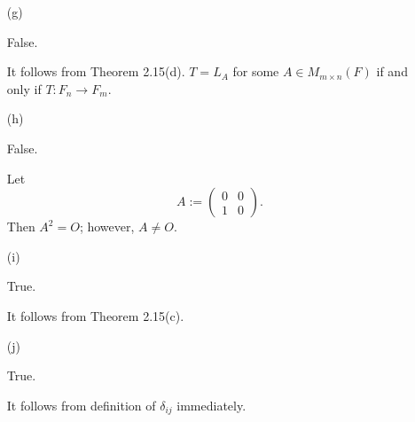 \begin{Exercise}
\begin{enumerate}[(a)]
		\item[(g)]
		\begin{answer}
			False.
		\end{answer}
		\begin{solution}
			It follows from Theorem 2.15(d). $T = L_A$ for some $A\in M_{m\times n}(F)$ if and only if  $T:F_n\to F_m$.
		\end{solution}
		
		\item[(h)]
		\begin{answer}
			False.
		\end{answer}
		\begin{solution}
			Let
			$$
			A := \begin{pmatrix}
			0 & 0 \\
			1 & 0
			\end{pmatrix}.
			$$
			Then $A^2 = O$; however, $A\neq O$.
		\end{solution}
		
		\item[(i)]
		\begin{answer}
			True.
		\end{answer}
		\begin{solution}
			It follows from Theorem 2.15(c).
		\end{solution}
		
		\item[(j)]
		\begin{answer}
			True.
		\end{answer}
		\begin{solution}
			It follows from definition of $\delta_{i j}$ immediately.
		\end{solution}
		
	\end{enumerate}
\end{Exercise}